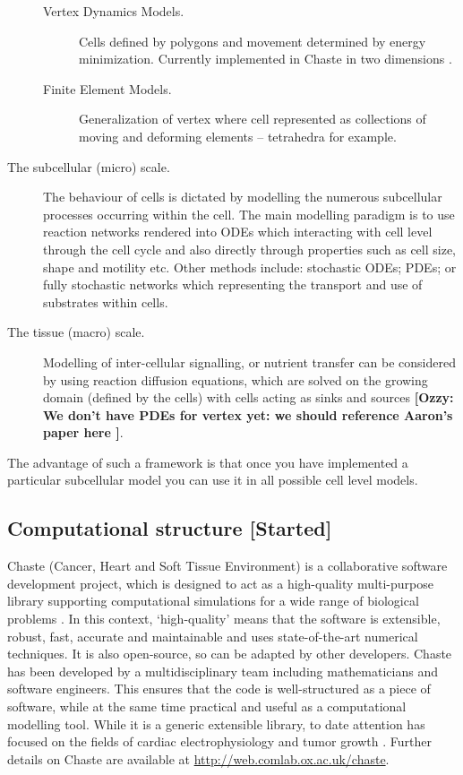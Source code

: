 \documentclass[a4paper,12pt]{article}
\newcommand{\todo}{[Started]}
\newcommand{\authornote}[2]{{\bf [#1: #2]}}
\newcommand{\ozzy}[1]{\authornote{Ozzy}{#1}}
\begin{document}
\begin{description}
\begin{description}
	    \item[Vertex Dynamics Models.] Cells defined by polygons
    and movement determined by energy minimization. Currently implemented in Chaste in two 
    dimensions \citep{Osborne2010Hybrid}.

	    \item[Finite Element Models.] Generalization of vertex where cell
    represented as collections of moving and deforming elements -- tetrahedra for
    example.	

    \end{description}

    \item [The subcellular (micro) scale.] {The behaviour of cells is dictated by modelling 
    the numerous subcellular processes occurring within the cell. The main modelling paradigm 
    is to use reaction networks rendered into ODEs which interacting with cell level through 
    the cell cycle and also directly through properties such as cell size, shape and motility 
    etc. Other methods include: stochastic ODEs; PDEs; or fully stochastic networks which 
    representing the transport and use of substrates within cells.}

    \item [The tissue (macro) scale.] {Modelling of inter-cellular signalling, or nutrient 
    transfer can be considered by using reaction diffusion equations, 
    which are solved on the growing domain (defined by the cells) with cells acting as sinks 
    and sources \ozzy{We don't have PDEs for vertex yet: we should 
    reference Aaron's paper here \citep{SmithSubmitted}}.}
\end{description}

The advantage of such a framework is that once you have implemented a particular subcellular 
model you can use it in all possible cell level models.

\subsection{Computational structure \todo} \label{sec:computational_structure}
Chaste (Cancer, Heart and Soft Tissue Environment) is a collaborative software
development project, which is designed to act as a high-quality multi-purpose library
supporting computational simulations for a wide range of biological problems \citep{Pitt-Francis2008Chaste}. 
In this context, ‘high-quality’ means that the software is extensible, robust, fast, accurate and
maintainable and uses state-of-the-art numerical techniques. It is also open-source, so
can be adapted by other developers. Chaste has been developed by a multidisciplinary
team including mathematicians and software engineers. This ensures that the code is
well-structured as a piece of software, while at the same time practical and useful as a
computational modelling tool. While it is a generic extensible library, to date attention
has focused on the fields of cardiac electrophysiology and tumor growth \citep{Pitt-Francis2009Chaste}. 
Further details on Chaste are available at \url{http://web.comlab.ox.ac.uk/chaste}.
\end{document}
